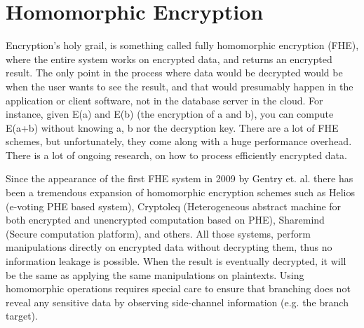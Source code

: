 \section{Homomorphic Encryption}\label{s:homomorphic-encryption}
Encryption's holy grail, is something called fully homomorphic encryption (FHE)\cite{gentry2009fully}, where the entire system works on encrypted data, and returns an encrypted result.
The only point in the process where data would be decrypted would be when the user wants to see the result, and that would presumably happen in the application or client software, not in the database server in the cloud.
For instance, given E(a) and E(b) (the encryption of a and b), you can compute E(a+b) without knowing a, b nor the decryption key.
There are a lot of FHE schemes, but unfortunately, they come along with a huge performance overhead.
There is a lot of ongoing research, on how to process efficiently encrypted data.

Since the appearance of the first FHE system in 2009 by Gentry et. al. there has been a tremendous expansion of homomorphic encryption schemes such as Helios (e-voting PHE based system)\cite{adida2008helios}, Cryptoleq (Heterogeneous abstract machine for both encrypted and unencrypted computation based on PHE)\cite{mazonka2016cryptoleq}, Sharemind (Secure computation platform)\cite{bogdanov2008sharemind, bogdanov2013sharemind}, and others.
All those systems, perform manipulations directly on encrypted data without decrypting them, thus no information leakage is possible.
When the result is eventually decrypted, it will be the same as applying the same manipulations on plaintexts.
Using homomorphic operations requires special care to ensure that branching does not reveal any sensitive data by observing side-channel information (e.g. the branch target).
